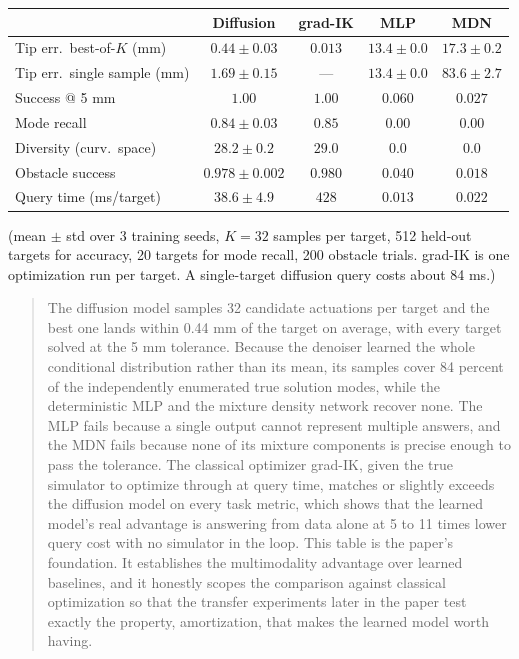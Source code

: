 \documentclass[11pt]{article}
\newcommand{\desc}[1]{\begin{quote}\small #1\end{quote}}
\begin{document}
\begin{center}
\begin{tabular}{lcccc}
\toprule
 & Diffusion & grad-IK & MLP & MDN \\
\midrule
Tip err.\ best-of-$K$ (mm) & $0.44\pm0.03$ & $\mathbf{0.013}$ & $13.4\pm0.0$ & $17.3\pm0.2$ \\
Tip err.\ single sample (mm) & $\mathbf{1.69\pm0.15}$ & --- & $13.4\pm0.0$ & $83.6\pm2.7$ \\
Success @ 5 mm & $\mathbf{1.00}$ & $\mathbf{1.00}$ & $0.060$ & $0.027$ \\
Mode recall & $0.84\pm0.03$ & $\mathbf{0.85}$ & $0.00$ & $0.00$ \\
Diversity (curv.\ space) & $28.2\pm0.2$ & $\mathbf{29.0}$ & $0.0$ & $0.0$ \\
Obstacle success & $0.978\pm0.002$ & $\mathbf{0.980}$ & $0.040$ & $0.018$ \\
Query time (ms/target) & $38.6\pm4.9$ & $428$ & $\mathbf{0.013}$ & $0.022$ \\
\bottomrule
\end{tabular}

{\small (mean $\pm$ std over 3 training seeds, $K{=}32$ samples per target,
512 held-out targets for accuracy, 20 targets for mode recall, 200 obstacle
trials. grad-IK is one optimization run per target. A single-target diffusion
query costs about 84 ms.)}
\end{center}

\desc{The diffusion model samples 32 candidate actuations per target and the
best one lands within 0.44 mm of the target on average, with every target
solved at the 5 mm tolerance. Because the denoiser learned the whole
conditional distribution rather than its mean, its samples cover 84 percent
of the independently enumerated true solution modes, while the deterministic
MLP and the mixture density network recover none. The MLP fails because a
single output cannot represent multiple answers, and the MDN fails because
none of its mixture components is precise enough to pass the tolerance. The
classical optimizer grad-IK, given the true simulator to optimize through at
query time, matches or slightly exceeds the diffusion model on every task
metric, which shows that the learned model's real advantage is answering
from data alone at 5 to 11 times lower query cost with no simulator in the
loop. This table is the paper's foundation. It establishes the multimodality
advantage over learned baselines, and it honestly scopes the comparison
against classical optimization so that the transfer experiments later in the
paper test exactly the property, amortization, that makes the learned model
worth having.}
\end{document}
